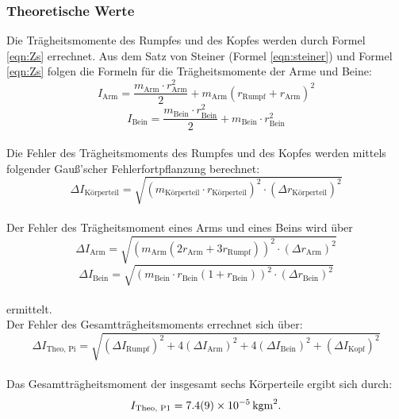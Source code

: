 \subsubsection{Theoretische Werte}
Die Trägheitsmomente des Rumpfes und des Kopfes werden durch Formel \eqref{eqn:Zs} errechnet.
Aus dem Satz von Steiner (Formel \eqref{eqn:steiner}) und Formel \eqref{eqn:Zs} folgen die Formeln für die Trägheitsmomente der Arme und Beine:
\begin{equation*}
  I_{\text{Arm}}= \frac{m_{\text{Arm}} \cdot r_{\text{Arm}}^2}{2} + m_{\text{Arm}}(r_{\text{Rumpf}} + r_{\text{Arm}})^2
\end{equation*}
\begin{equation}
  I_{\text{Bein}}= \frac{m_{\text{Bein}} \cdot r_{\text{Bein}}^2}{2} + m_{\text{Bein}} \cdot r_{\text{Bein}}^2
  \label{eqn:bein}
\end{equation}
\\Die Fehler des Trägheitsmoments des Rumpfes und des Kopfes werden mittels folgender Gauß'scher Fehlerfortpflanzung berechnet:
\begin{equation}
  \Delta I_{\text{Körperteil}} = \sqrt{ (m_{\text{Körperteil}} \cdot r_{\text{Körperteil}})^2 \cdot (\Delta r_{\text{Körperteil}})^2 }
  \label{eqn:deltairumpf}
\end{equation}
\\Der Fehler des Trägheitsmoment eines Arms und eines Beins wird über
\begin{equation*}
  \Delta I_{\text{Arm}} = \sqrt{ \left(m_{\text{Arm}}(2 r_{\text{Arm}} + 3 r_{\text{Rumpf}}) \right)^2 \cdot (\Delta r_{\text{Arm}})^2}
\end{equation*}
\begin{equation}
  \Delta I_{\text{Bein}} = \sqrt{ \left(m_{\text{Bein}} \cdot r_{\text{Bein}} (1 + r_{\text{Bein}}) \right)^2 \cdot (\Delta r_{\text{Bein}})^2}
  \label{eqn:ibein}
\end{equation}
\\ermittelt.
\\Der Fehler des Gesamtträgheitsmoments errechnet sich über:
\begin{equation}
  \Delta I_{\text{Theo, Pi}} = \sqrt{ (\Delta I_{\text{Rumpf}})^2 + 4(\Delta I_{\text{Arm}})^2 + 4(\Delta I_{\text{Bein}})^2 + (\Delta I_{\text{Kopf}})^2}
  \label{eqn:deltatheo}
\end{equation}
\\Das Gesamtträgheitsmoment der insgesamt sechs Körperteile ergibt sich durch:
\begin{equation*}
  I_{\text{Theo, P1}}=\SI{7.4 \pm 0.9e-5}{kg m^2}.
\end{equation*}

